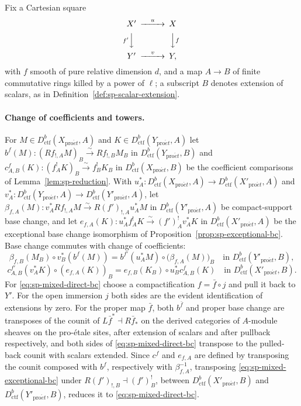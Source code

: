 \documentclass[11pt,a4paper]{article}
\numberwithin{equation}{section}
\theoremstyle{definition}
\theoremstyle{remark}
\newcommand{\proet}{\mathrm{pro}\acute{e}t}
\newcommand{\Dctf}{D^b_{\mathrm{ctf}}}
\begin{document}
Fix a Cartesian square
\[
\begin{CD}
 X' @>{u}>> X\\
 @V{f'}VV @VV{f}V\\
 Y' @>{v}>> Y,
\end{CD}
\]
with $f$ smooth of pure relative dimension $d$, and a map $A\to B$ of
finite commutative rings killed by a power of $\ell$; a subscript $B$
denotes extension of scalars, as in
Definition~\ref{def:sp-scalar-extension}.

\paragraph{Change of coefficients and towers.}
For $M\in\Dctf(X_{\proet},A)$ and $K\in\Dctf(Y_{\proet},A)$ let
$b^f(M):(Rf_{!,A}M)_B\xrightarrow{\sim}Rf_{!,B}M_B$ in
$\Dctf(Y_{\proet},B)$ and
$c^f_{A,B}(K):(f_A^!K)_B\xrightarrow{\sim}f_B^!K_B$ in
$\Dctf(X_{\proet},B)$ be the coefficient
comparisons of Lemma~\ref{lem:sp-reduction}. With
$u_A^*\colon\Dctf(X_{\proet},A)\to\Dctf(X'_{\proet},A)$ and
$v_A^*\colon\Dctf(Y_{\proet},A)\to\Dctf(Y'_{\proet},A)$, let
$\beta_{f,A}(M):v_A^*Rf_{!,A}M\xrightarrow{\sim}R(f')_{!,A}u_A^*M$ in
$\Dctf(Y'_{\proet},A)$ be
compact-support base change, and let
$e_{f,A}(K):u_A^*f_A^!K\xrightarrow{\sim}(f')_A^!v_A^*K$ in
$\Dctf(X'_{\proet},A)$ be the
exceptional base change isomorphism of
Proposition~\ref{prop:sp-exceptional-bc}. Base change commutes with
change of coefficients:
\begin{equation}\label{eq:sp-mixed-direct-bc}
 \beta_{f,B}(M_B)\circ v_B^*(b^f(M))
 =b^{f'}(u_A^*M)\circ\bigl(\beta_{f,A}(M)\bigr)_B
 \quad\text{in }\Dctf(Y'_{\proet},B),
\end{equation}
\begin{equation}\label{eq:sp-mixed-exceptional-bc}
 c^{f'}_{A,B}(v_A^*K)\circ(e_{f,A}(K))_B
 =e_{f,B}(K_B)\circ u_B^*c^f_{A,B}(K)
 \quad\text{in }\Dctf(X'_{\proet},B).
\end{equation}
For \eqref{eq:sp-mixed-direct-bc} choose a compactification
$f=\bar f\circ j$ and pull it back to $Y'$. For the open immersion $j$
both sides are the evident identification of extensions by zero. For the
proper map $\bar f$, both $b^{\bar f}$ and proper base change are
transposes of the counit of $L\bar f^*\dashv R\bar f_*$ on the derived
categories of $A$-module sheaves on the pro-\'etale sites, after extension
of scalars and after pullback respectively, and both sides of
\eqref{eq:sp-mixed-direct-bc} transpose to the pulled-back counit with
scalars extended. Since $c^f$ and $e_{f,A}$ are defined by transposing
the counit composed with $b^f$, respectively with $\beta_{f,A}^{-1}$,
transposing \eqref{eq:sp-mixed-exceptional-bc} under
$R(f')_{!,B}\dashv(f')_B^!$, between $\Dctf(X'_{\proet},B)$ and
$\Dctf(Y'_{\proet},B)$, reduces it to \eqref{eq:sp-mixed-direct-bc}.
\end{document}
